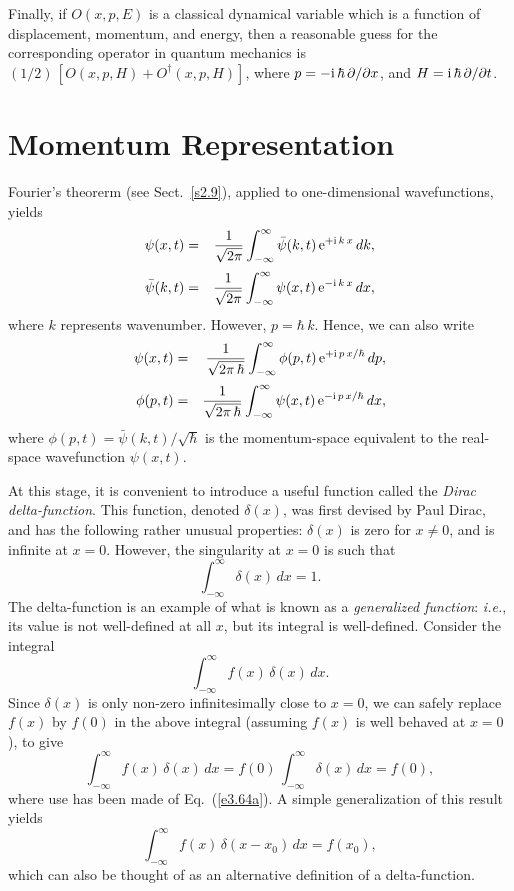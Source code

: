 Finally, if $O(x,p,E)$ is a classical dynamical variable which is
a function of displacement, momentum, and energy, then a reasonable
guess for the corresponding operator in quantum mechanics is
$(1/2)\,[O(x,p,H)+ O^\dag(x,p,H)]$, where $p=-{\rm i}\,\hbar\,\partial/\partial x$, and $H={\rm i}\,\hbar\,\partial/\partial t$.

\section{Momentum Representation}
Fourier's theorerm (see Sect.~\ref{s2.9}), applied to one-dimensional wavefunctions, yields
\begin{eqnarray}
\psi(x,t) &=& \frac{1}{\sqrt{2 \pi}}\int_{-\infty}^{\infty} \bar{\psi}(k,t)\,{\rm e}^{+{\rm i}\,k\,x}\,dk,\\[0.5ex]
\bar{\psi}(k,t) &=& \frac{1}{\sqrt{2 \pi}}\int_{-\infty}^\infty \psi(x,t)\,{\rm e}^{-{\rm i}\,k\,x}\,dx,
\end{eqnarray}
where $k$ represents wavenumber. However, $p=\hbar\,k$. Hence,
we can also write
\begin{eqnarray}\label{e3.64}
\psi(x,t) &=& \frac{1}{\sqrt{2\pi\,\hbar}}\int_{-\infty}^{\infty} \phi(p,t)\,{\rm e}^{+{\rm i}\,p\,x/\hbar}\,dp,\\[0.5ex]
\phi(p,t) &=& \frac{1}{\sqrt{2\pi\,\hbar}}\int_{-\infty}^\infty \psi(x,t)\,{\rm e}^{-{\rm i}\,p\,x/\hbar}\,dx,\label{e3.65}
\end{eqnarray}
where $\phi(p,t)= \bar{\psi}(k,t)/\sqrt{\hbar}$ is the momentum-space
equivalent to the real-space wavefunction $\psi(x,t)$.

At this stage, it is convenient to introduce a  useful function called the
{\em Dirac delta-function}. This function, denoted $\delta(x)$, was
first devised by Paul Dirac, and has the following rather
unusual properties: $\delta(x)$ is zero for $x\neq 0$, and is infinite
at $x=0$. However, the singularity at $x=0$ is such that
\begin{equation}\label{e3.64a}
\int_{-\infty}^{\infty}\delta(x)\,dx = 1.
\end{equation}
The delta-function is an example of what is known as a {\em generalized function}: {\em i.e.}, 
its value is not well-defined at all $x$, but its integral is well-defined.
Consider the integral
\begin{equation}
\int_{-\infty}^{\infty}f(x)\,\delta(x)\,dx.
\end{equation}
Since $\delta(x)$ is only non-zero infinitesimally close to $x=0$, we
can safely replace $f(x)$ by $f(0)$ in the above integral (assuming $f(x)$
is well behaved at $x=0$), to give
\begin{equation}
\int_{-\infty}^{\infty}f(x)\,\delta(x)\,dx = f(0)\,\int_{-\infty}^{\infty}\delta(x)\,dx=f(0),
\end{equation}
where use has been made of Eq.~(\ref{e3.64a}). A simple generalization of this result yields
\begin{equation}\label{e3.69}
\int_{-\infty}^\infty f(x)\,\delta(x-x_0)\,dx = f(x_0),
\end{equation}
which can also be thought of as an alternative definition of a delta-function.

